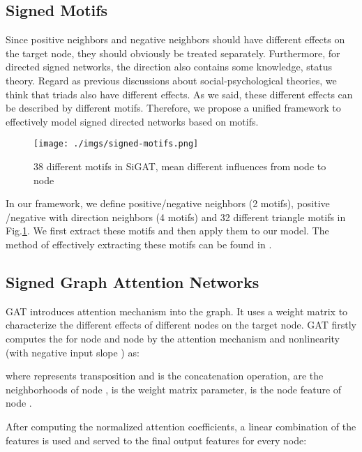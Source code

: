 \documentclass[runningheads]{llncs}
\begin{document}
\subsection{Signed Motifs}

Since positive neighbors and negative neighbors should have different effects on the target node, they should obviously be treated separately.
Furthermore, for directed signed networks, the direction also contains some knowledge, \eg status theory.
Regard as previous discussions about social-psychological theories, we think that triads also have different effects. 
As we said, these different effects can be described by different motifs.
Therefore, we propose a unified framework to effectively model signed directed networks based on motifs.

\begin{figure}[H]
    \centering
    \texttt{[image: ./imgs/signed-motifs.png]}
    \caption{38 different motifs in SiGAT, mean different influences from node  to node } 
    \label{fig:motifs}
    \vspace{-10px}
\end{figure}

In our framework, we define positive/negative neighbors (2 motifs), positive /negative with direction neighbors (4 motifs) and 32 different triangle motifs in Fig.\ref{fig:motifs}. 
We first extract these motifs and then apply them to our model. The method of effectively extracting these motifs can be found in \cite{schank2005finding}.



\subsection{Signed Graph Attention Networks}
GAT\cite{velickovic2017graph} introduces attention mechanism into the graph.
It uses a weight matrix to characterize the different effects of different nodes on the target node.
GAT firstly computes the  for node  and node  by the attention mechanism  and  nonlinearity (with negative input slope ) as:

where  represents transposition and  is the concatenation operation,  are the neighborhoods of node ,  is the weight matrix parameter,  is the node feature of node .

After computing the normalized attention coefficients, a linear combination of the features is used and served to the final output features for every node:
\end{document}
